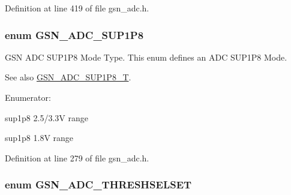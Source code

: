 Definition at line 419 of file gsn\_\-adc.h.

\hypertarget{a00643_gadc3afaf6a966c7c6199e4d8f37da8b73}{
\subsubsection[{GSN\_\-ADC\_\-SUP1P8}]{\setlength{\rightskip}{0pt plus 5cm}enum {\bf GSN\_\-ADC\_\-SUP1P8}}}
\label{a00643_gadc3afaf6a966c7c6199e4d8f37da8b73}


GSN ADC SUP1P8 Mode Type. This enum defines an ADC SUP1P8 Mode. 

\begin{DoxySeeAlso}{See also}
\hyperlink{a00643_ga79b5244aa923d094c80c37462b10dded}{GSN\_\-ADC\_\-SUP1P8\_\-T}. 
\end{DoxySeeAlso}
\begin{Desc}
\item[Enumerator: ]\par
\begin{description}
\item[{\em 
\hypertarget{a00643_ggadc3afaf6a966c7c6199e4d8f37da8b73a373a83a479cc10783a719934a63cd5a4}{
GSN\_\-ADC\_\-AVDD\_\-3Vrange}
\label{a00643_ggadc3afaf6a966c7c6199e4d8f37da8b73a373a83a479cc10783a719934a63cd5a4}
}]sup1p8 2.5/3.3V range \item[{\em 
\hypertarget{a00643_ggadc3afaf6a966c7c6199e4d8f37da8b73a780aa6f8661d3d07f2a1d2368c377673}{
GSN\_\-ADC\_\-AVDD\_\-2Vrange}
\label{a00643_ggadc3afaf6a966c7c6199e4d8f37da8b73a780aa6f8661d3d07f2a1d2368c377673}
}]sup1p8 1.8V range \end{description}
\end{Desc}



Definition at line 279 of file gsn\_\-adc.h.

\hypertarget{a00643_ga1ce87a8054fcb9ddfc65af6e2ceae738}{
\subsubsection[{GSN\_\-ADC\_\-THRESHSELSET}]{\setlength{\rightskip}{0pt plus 5cm}enum {\bf GSN\_\-ADC\_\-THRESHSELSET}}}
\label{a00643_ga1ce87a8054fcb9ddfc65af6e2ceae738}


